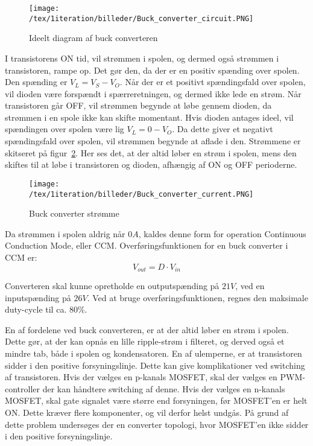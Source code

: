 \begin{figure}[H]
	\center
	\texttt{[image: /tex/1iteration/billeder/Buck\_converter\_circuit.PNG]}
	\caption{Ideelt diagram af buck converteren
		\cite{buck-converter}}
	\label{fig:buck_converter_circuit}
\end{figure}


I transistorens ON tid, vil strømmen i spolen, og dermed også strømmen i transistoren, rampe op. Det gør den, da der er en positiv spænding over spolen. Den spænding er $V_L=V_S-V_O$. Når der er et positivt spændingsfald over spolen, vil dioden være forspændt i spærreretningen, og dermed ikke lede en strøm. Når transistoren går OFF, vil strømmen begynde at løbe gennem dioden, da strømmen i en spole ikke kan skifte momentant. Hvis dioden antages ideel, vil spændingen over spolen være lig $V_L=0-V_O$. Da dette giver et negativt spændingsfald over spolen, vil strømmen begynde at aflade i den. Strømmene er skitseret på figur~\ref{fig:buck_converter_current}. Her ses det, at der altid løber en strøm i spolen, mens den skiftes til at løbe i transistoren og dioden, afhængig af ON og OFF perioderne. 


\begin{figure}[H]
	\center
	\texttt{[image: /tex/1iteration/billeder/Buck\_converter\_current.PNG]}
	\caption{Buck converter strømme
		\cite{buck-converter}}
	\label{fig:buck_converter_current}
\end{figure}


Da strømmen i spolen aldrig når $0A$, kaldes denne form for operation Continuous Conduction Mode, eller CCM. Overføringsfunktionen for en buck converter i CCM er\cite{SMPS-topologies2}:
\begin{equation} \label{buck_converter_overforinsfunktion}
V_{out} = D\cdot V_{in}
\end{equation}

Converteren skal kunne opretholde en outputspænding på $21V$, ved en inputspænding på $26V$. Ved at bruge overføringsfunktionen, regnes den maksimale duty-cycle til ca. $80\percent$. 

En af fordelene ved buck converteren, er at der altid løber en strøm i spolen. Dette gør, at der kan opnås en lille ripple-strøm i filteret, og derved også et mindre tab, både i spolen og kondensatoren. 
En af ulemperne, er at transistoren sidder i den positive forsyningslinje. Dette kan give komplikationer ved switching af transistoren. Hvis der vælges en p-kanals MOSFET, skal der vælges en PWM-controller der kan håndtere switching af denne. Hvis der vælges en n-kanals MOSFET, skal gate signalet være større end forsyningen, før MOSFET'en er helt ON. Dette kræver flere komponenter, og vil derfor helst undgås. På grund af dette problem undersøges der en converter topologi, hvor MOSFET'en ikke sidder i den positive forsyningslinje.

